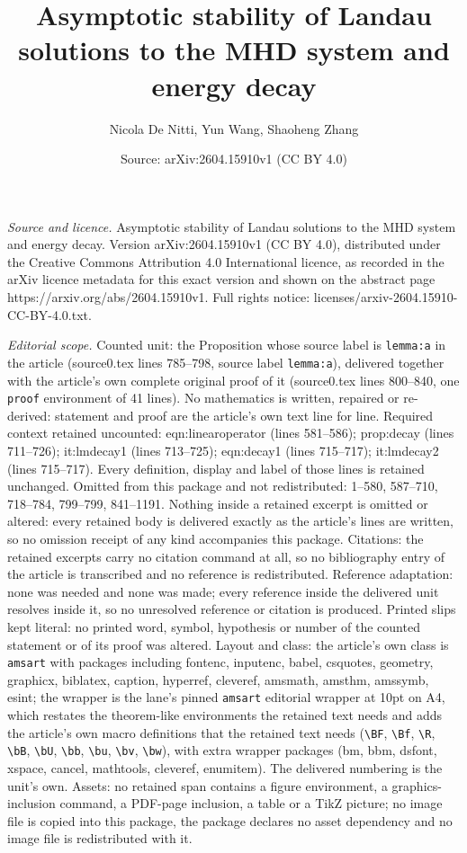 \documentclass[10pt,a4paper]{amsart}
\title[Asymptotic stability of Landau solutions to the MHD system a]{Asymptotic stability of Landau solutions to the MHD system and energy decay}
\author{Nicola De Nitti, Yun Wang, Shaoheng Zhang}
\date{Source: arXiv:2604.15910v1 (CC BY 4.0)}
\begin{document}
\maketitle

\noindent\emph{Source and licence.} Asymptotic stability of Landau solutions to the MHD system and energy decay. Version arXiv:2604.15910v1 (CC BY 4.0), distributed under the Creative Commons Attribution 4.0 International licence, as recorded in the arXiv licence metadata for this exact version and shown on the abstract page https://arxiv.org/abs/2604.15910v1. Full rights notice: licenses/arxiv-2604.15910-CC-BY-4.0.txt.\par\smallskip

\noindent\textit{Editorial scope.} Counted unit: the Proposition whose source label is \texttt{lemma:a} in the article (source0.tex lines 785--798, source label \texttt{lemma:a}), delivered together with the article's own complete original proof of it (source0.tex lines 800--840, one \texttt{proof} environment of 41 lines). No mathematics is written, repaired or re-derived: statement and proof are the article's own text line for line. Required context retained uncounted: eqn:linearoperator (lines 581--586); prop:decay (lines 711--726); it:lmdecay1 (lines 713--725); eqn:decay1 (lines 715--717); it:lmdecay2 (lines 715--717). Every definition, display and label of those lines is retained unchanged. Omitted from this package and not redistributed: 1--580, 587--710, 718--784, 799--799, 841--1191. Nothing inside a retained excerpt is omitted or altered: every retained body is delivered exactly as the article's lines are written, so no omission receipt of any kind accompanies this package. Citations: the retained excerpts carry no citation command at all, so no bibliography entry of the article is transcribed and no reference is redistributed. Reference adaptation: none was needed and none was made; every reference inside the delivered unit resolves inside it, so no unresolved reference or citation is produced. Printed slips kept literal: no printed word, symbol, hypothesis or number of the counted statement or of its proof was altered. Layout and class: the article's own class is \texttt{amsart} with packages including fontenc, inputenc, babel, csquotes, geometry, graphicx, biblatex, caption, hyperref, cleveref, amsmath, amsthm, amssymb, esint; the wrapper is the lane's pinned \texttt{amsart} editorial wrapper at 10pt on A4, which restates the theorem-like environments the retained text needs and adds the article's own macro definitions that the retained text needs (\texttt{\textbackslash BF}, \texttt{\textbackslash Bf}, \texttt{\textbackslash R}, \texttt{\textbackslash bB}, \texttt{\textbackslash bU}, \texttt{\textbackslash bb}, \texttt{\textbackslash bu}, \texttt{\textbackslash bv}, \texttt{\textbackslash bw}), with extra wrapper packages (bm, bbm, dsfont, xspace, cancel, mathtools, cleveref, enumitem). The delivered numbering is the unit's own. Assets: no retained span contains a figure environment, a graphics-inclusion command, a PDF-page inclusion, a table or a TikZ picture; no image file is copied into this package, the package declares no asset dependency and no image file is redistributed with it. 
\end{document}
